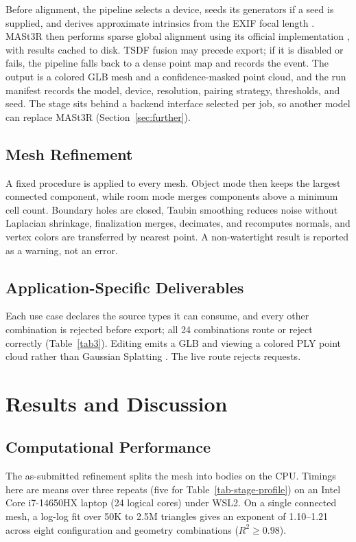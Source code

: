 \documentclass[conference]{IEEEtran}
\begin{document}
Before alignment, the pipeline selects a device, seeds its generators if a seed is
supplied, and derives approximate intrinsics from the EXIF focal length \cite{b10}.
MASt3R then performs sparse global alignment using its official implementation
\cite{b11}, with results cached to disk. TSDF fusion
may precede export; if it is disabled or fails, the pipeline falls back to a dense
point map and records the event. The output is a colored GLB mesh and a
confidence-masked point cloud, and the run manifest records the model, device,
resolution, pairing strategy, thresholds, and seed. The stage sits behind a backend
interface selected per job, so another model can replace MASt3R
(Section~\ref{sec:further}).

\subsection{Mesh Refinement}

A fixed procedure is applied to every mesh. Object mode then keeps the largest connected component, while
room mode merges components above a minimum cell count. Boundary holes are closed,
Taubin smoothing reduces noise without Laplacian shrinkage, finalization merges,
decimates, and recomputes normals, and vertex colors are transferred by nearest
point. A non-watertight result is reported as a warning, not an error.

\subsection{Application-Specific Deliverables}

Each use case declares the source types it can consume, and every other combination
is rejected before export; all 24 combinations route or reject correctly
(Table~\ref{tab3}). Editing emits a GLB and viewing a colored PLY point cloud rather
than Gaussian Splatting \cite{b21}. The live route rejects requests.

\section{Results and Discussion}

\subsection{Computational Performance}
\label{sec:comp-performance}

The as-submitted refinement splits the mesh into bodies on the CPU. Timings here
are means over three repeats (five for Table~\ref{tab-stage-profile}) on an Intel
Core i7-14650HX laptop (24 logical cores) under WSL2. On a single connected mesh,
a log-log fit over 50K to 2.5M triangles gives an exponent of 1.10--1.21 across
eight configuration and geometry combinations ($R^2 \geq 0.98$).
\end{document}
